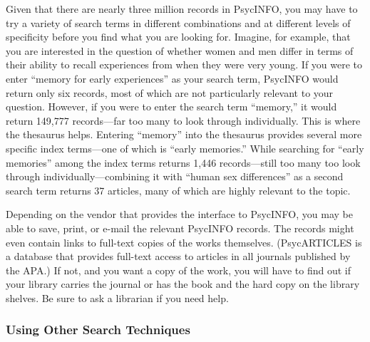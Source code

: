 \documentclass[
]{krantz}
\begin{document}
Given that there are nearly three million records in PsycINFO, you may have to try a variety of search terms in different combinations and at different levels of specificity before you find what you are looking for. Imagine, for example, that you are interested in the question of whether women and men differ in terms of their ability to recall experiences from when they were very young. If you were to enter ``memory for early experiences'' as your search term, PsycINFO would return only six records, most of which are not particularly relevant to your question. However, if you were to enter the search term ``memory,'' it would return 149,777 records---far too many to look through individually. This is where the thesaurus helps. Entering ``memory'' into the thesaurus provides several more specific index terms---one of which is ``early memories.'' While searching for ``early memories'' among the index terms returns 1,446 records---still too many too look through individually---combining it with ``human sex differences'' as a second search term returns 37 articles, many of which are highly relevant to the topic.

Depending on the vendor that provides the interface to PsycINFO, you may be able to save, print, or e-mail the relevant PsycINFO records. The records might even contain links to full-text copies of the works themselves. (PsycARTICLES is a database that provides full-text access to articles in all journals published by the APA.) If not, and you want a copy of the work, you will have to find out if your library carries the journal or has the book and the hard copy on the library shelves. Be sure to ask a librarian if you need help.

\hypertarget{using-other-search-techniques}{%
\subsubsection*{Using Other Search Techniques}\label{using-other-search-techniques}}
\end{document}
